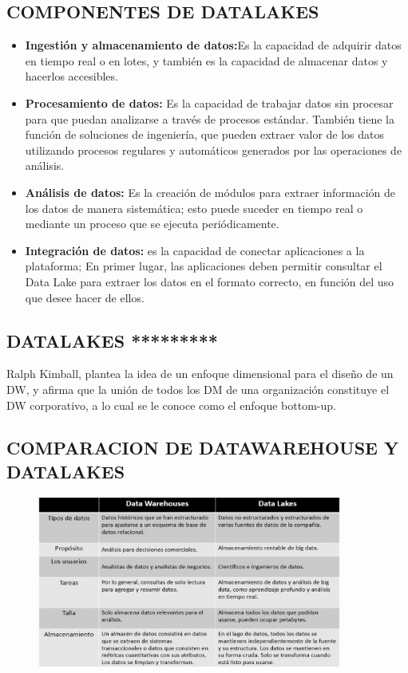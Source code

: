 \documentclass[%
 reprint,
 amsmath,amssymb,
 aps,
]{revtex4-1}
\begin{document}
\subsection{COMPONENTES DE DATALAKES}

\begin{itemize}
	\item \textbf{ Ingestión y almacenamiento de datos:}Es la capacidad de adquirir datos en tiempo real o en lotes, y también es la capacidad de almacenar datos y hacerlos accesibles.
	\item  \textbf{Procesamiento de datos:} Es la capacidad de trabajar datos sin procesar para que puedan analizarse a través de procesos estándar. 
También tiene la función de soluciones de ingeniería, que pueden extraer valor de los datos utilizando procesos regulares y automáticos generados por las operaciones de análisis.
	\item  \textbf{ Análisis de datos:} Es la creación de módulos para extraer información de los datos de manera sistemática; esto puede suceder en tiempo real o mediante un proceso que se ejecuta periódicamente.
	\item  \textbf{Integración de datos:} es la capacidad de conectar aplicaciones a la plataforma; En primer lugar, las aplicaciones deben permitir consultar el Data Lake para extraer los datos en el formato correcto, en función del uso que desee hacer de ellos.
\end{itemize}

\subsection{DATALAKES *********}

Ralph Kimball, plantea la idea de un enfoque dimensional para el diseño de un DW, y afirma que la unión de todos los DM de una organización constituye el DW corporativo, a lo cual se le conoce como el enfoque bottom-up.\\


\subsection{COMPARACION DE DATAWAREHOUSE Y DATALAKES}	
\begin{figure}[htb]
				\begin{center}
					\includegraphics[width=10cm]{./IMAGENES/Imagen1}
				\end{center}
			\end{figure}
\end{document}
